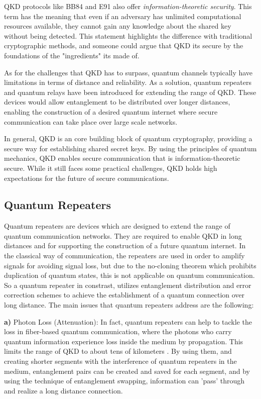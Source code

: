 \documentclass[12pt]{ieeetj}
\begin{document}
		QKD protocols like BB84 and E91 also offer \textit{information-theoretic security}. This term has the meaning that even 
		if an adversary has unlimited computational resources available, they cannot gain any knowledge about the 
		shared key without being detected. This statement highlights the difference with traditional cryptographic methods, and 
		someone could argue that QKD its secure by the foundations of the "ingredients" its made of.

		As for the challenges that QKD has to surpass, quantum channels typically have limitations in terms of distance and reliability.
		As a solution, quantum repeaters and quantum relays have been introduced for extending the range of QKD. 
		These devices would allow entanglement to be distributed over longer distances, 
		enabling the construction of a desired quantum internet where secure communication can take place over large scale networks.

		In general, QKD is an core building block of quantum cryptography,
		providing a secure way for establishing shared secret keys. 
		By using the principles of quantum mechanics, QKD enables secure communication that is 
		information-theoretic secure. While it still faces some practical challenges, QKD holds high expectations for the 
		future of secure communications.

		\subsection{Quantum Repeaters}
		
		Quantum repeaters are devices which are designed to extend the range of quantum communication networks. They 
		are required to enable QKD in long distances and for supporting the construction of a future quantum internet.
		In the classical way of communication, the repeaters are used in order to amplify signals 
		for avoiding signal loss, but due to the no-cloning theorem which prohibits duplication of quantum states,
		this is not applicable on quantum communication. So a quantum repeater in constrast, utilizes entanglement distribution 
		and error correction schemes to achieve the establishment of a quantum connection over long distance.
		The main issues that quantum repeaters address are the following:

		\textbf{a)} Photon Loss (Attenuation):
		In fact, quantum repeaters can help to tackle the loss in fiber-based quantum communication,
		where the photons who carry quantum information experience loss inside the medium by propagation. 
		This limits the range of QKD to about tens of kilometers \cite{repeater1}. 
		By using them, and creating shorter segments with the interference of quantum repeaters in the medium,
		entanglement pairs can be created and saved for each segment, 
		and by using the technique of entanglement swapping, information can 'pass' through and realize a long distance connection.
\end{document}
